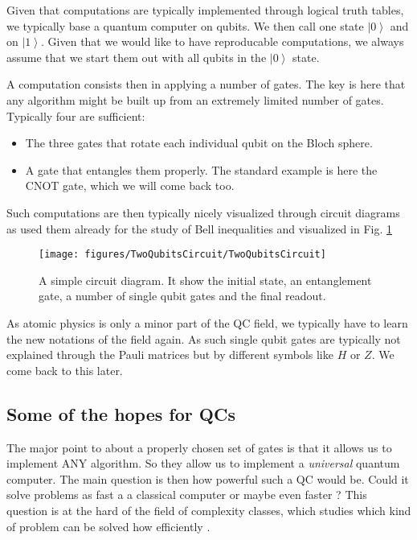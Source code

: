 \documentclass[10pt]{article}
\let\cite\citep
\providecommand\citep{\cite}
\newcommand{\ket}[1]{\ensuremath{\left|#1\right\rangle}}
\begin{document}
Given that computations are typically implemented through logical truth tables, we typically base a quantum computer on qubits. We then call one state $\ket{0}$ and on $\ket{1}$. Given that we would like to have reproducable computations, we always assume that we start them out with all qubits in the $\ket{0}$ state.

A computation consists then in applying a number of gates. The key is here that any algorithm might be built up from an extremely limited number of gates. Typically four are sufficient:
\begin{itemize}
\item The three gates that rotate each individual qubit on the Bloch sphere.
\item A gate that entangles them properly. The standard example is  here the CNOT gate, which we will come back too.
\end{itemize}

Such computations are then typically nicely visualized through circuit diagrams as used them already for the study of Bell inequalities and visualized in Fig. \ref{354313}
\begin{figure}[h!]
\begin{center}
\texttt{[image: figures/TwoQubitsCircuit/TwoQubitsCircuit]}
\caption{{A simple circuit diagram. It show the initial state, an entanglement
gate, a number of single qubit gates and the final readout.
{\label{354313}}%
}}
\end{center}
\end{figure}

As atomic physics is only a minor part of the QC field, we typically have to learn the new notations of the field again. As such single qubit gates are typically not explained through the Pauli matrices but by different symbols like $H$ or $Z$. We come back to this later.

\subsection{Some of the hopes for QCs}
The major point to about a properly chosen set of gates is that it allows us to implement ANY algorithm. So they allow us to implement a \textit{universal} quantum computer. The main question is then how powerful such a QC would be. Could it solve problems as fast a a classical computer or maybe even faster ? This question is at the hard of the field of complexity classes, which studies which kind of problem can be solved how efficiently \cite{zoo}. 
\end{document}

